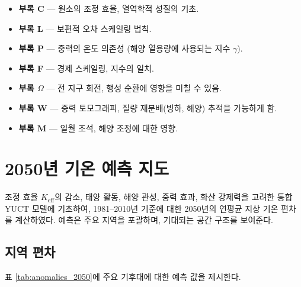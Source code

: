 \documentclass[11pt,a4paper]{article}
\newcommand{\ga}{\gamma}
\begin{document}
	\begin{itemize}
		\item \textbf{부록 C} — 원소의 조정 효율, 열역학적 성질의 기초.
		\item \textbf{부록 L} — 보편적 오차 스케일링 법칙.
		\item \textbf{부록 P} — 중력의 온도 의존성 (해양 열용량에 사용되는 지수 $\ga$).
		\item \textbf{부록 F} — 경제 스케일링, 지수의 일치.
		\item \textbf{부록 $\Omega$} — 전 지구 회전, 행성 순환에 영향을 미칠 수 있음.
		\item \textbf{부록 W} — 중력 토모그래피, 질량 재분배(빙하, 해양) 추적을 가능하게 함.
		\item \textbf{부록 M} — 일월 조석, 해양 조정에 대한 영향.
	\end{itemize}
	
	\section{2050년 기온 예측 지도}
	\label{sec:forecast_maps}
	
	조정 효율 $K_{\mathrm{eff}}$의 감소, 태양 활동, 해양 관성, 중력 효과, 화산 강제력을 고려한 통합 YUCT 모델에 기초하여, 1981–2010년 기준에 대한 2050년의 연평균 지상 기온 편차를 계산하였다. 예측은 주요 지역을 포괄하며, 기대되는 공간 구조를 보여준다.
	
	\subsection{지역 편차}
	
	표 \ref{tab:anomalies_2050}에 주요 기후대에 대한 예측 값을 제시한다.
	
\end{document}
